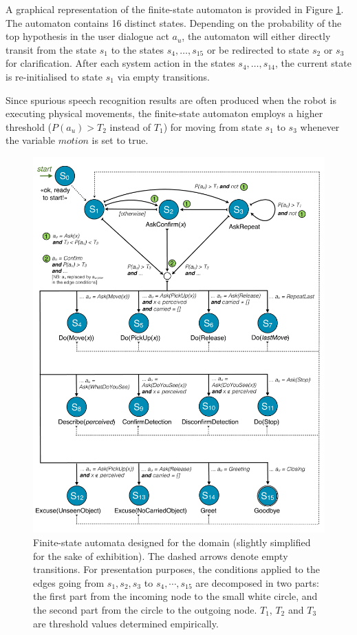 A graphical representation of the finite-state automaton is provided in Figure \ref{fig:fsa-exp3}.  The automaton contains 16 distinct states.  Depending on the probability of the top hypothesis in the user dialogue act $a_u$, the automaton will either directly transit from the state $s_1$ to the states $s_4, \dots, s_{15}$ or be redirected to state $s_2$ or $s_3$ for clarification. After each system action in the states $s_4, \dots, s_{14}$, the current state is re-initialised to state $s_1$ via empty transitions. 

Since spurious speech recognition results are often produced when the robot is executing physical movements, the finite-state automaton employs a higher threshold ($P(a_u) > T_2$ instead of $T_1$) for moving from state $s_1$ to $s_3$ whenever the variable $\mathit{motion}$ is set to true.


\begin{figure}[p]
\centering
\includegraphics[scale=0.36]{imgs/fsa-exp3.pdf} 
\caption{Finite-state automata designed for the domain (slightly simplified for the sake of exhibition). The dashed arrows denote empty transitions. For presentation purposes, the conditions applied to the edges going from $s_1,s_2,s_3$ to $s_4, \cdots, s_{15}$ are decomposed in two parts: the first part from the incoming node to the small white circle, and the second part from the circle to the outgoing node. $T_1$, $T_2$ and $T_3$ are threshold values determined empirically.}
\label{fig:fsa-exp3}
\end{figure}


